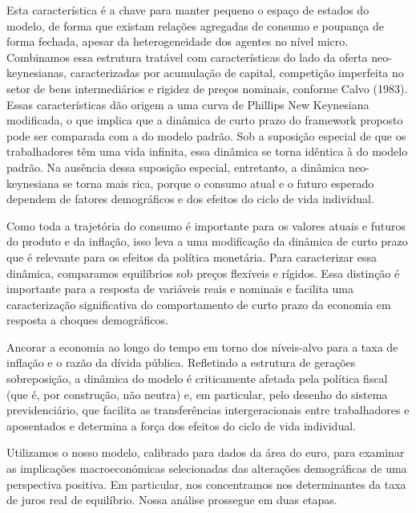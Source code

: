 Esta característica é a chave para manter pequeno o espaço de estados do modelo, de forma que existam relações agregadas de consumo e poupança de forma fechada, apesar da heterogeneidade dos agentes no nível micro. Combinamos essa estrutura tratável com características do lado da oferta neo-keynesianas, caracterizadas por acumulação de capital, competição imperfeita no setor de bens intermediários e rigidez de preços nominais, conforme Calvo (1983). Essas características dão origem a uma curva de Phillips New Keynesiana modificada, o que implica que a dinâmica de curto prazo do framework proposto pode ser comparada com a do modelo padrão. Sob a suposição especial de que os trabalhadores têm uma vida infinita, essa dinâmica se torna idêntica à do modelo padrão. Na ausência dessa suposição especial, entretanto, a dinâmica neo-keynesiana se torna mais rica, porque o consumo atual e o futuro esperado dependem de fatores demográficos e dos efeitos do ciclo de vida individual.

Como toda a trajetória do consumo é importante para os valores atuais e futuros do produto e da inflação, isso leva a uma modificação da dinâmica de curto prazo que é relevante para os efeitos da política monetária. Para caracterizar essa dinâmica, comparamos equilíbrios sob preços flexíveis e rígidos. Essa distinção é importante para a resposta de variáveis reais e nominais e facilita uma caracterização significativa do comportamento de curto prazo da economia em resposta a choques demográficos.


Ancorar a economia ao longo do tempo em torno dos níveis-alvo para a taxa de inflação e o razão da dívida pública. Refletindo a estrutura de gerações sobreposição, a dinâmica do modelo é criticamente afetada pela política fiscal (que é, por construção, não neutra) e, em particular, pelo desenho do sistema previdenciário, que facilita as transferências intergeracionais entre trabalhadores e aposentados e determina a força dos efeitos do ciclo de vida individual.

Utilizamos o nosso modelo, calibrado para dados da área do euro, para examinar as implicações macroeconómicas selecionadas das alterações demográficas de uma perspectiva positiva. Em particular, nos concentramos nos determinantes da taxa de juros real de equilíbrio. Nossa análise prossegue em duas etapas.

